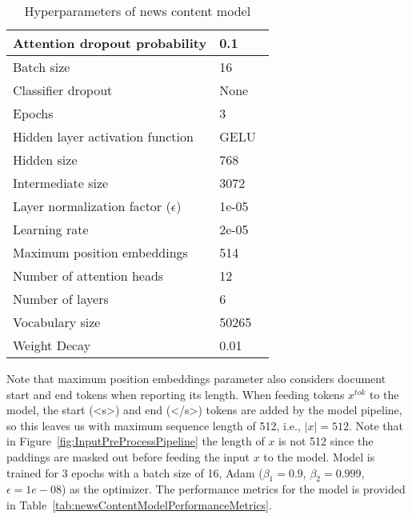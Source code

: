 \begin{table}
    \centering
    \begin{tabular}{|l|l|}
        \hline
        Attention dropout probability           & 0.1                             \\
        \hline
        Batch size                              & 16                              \\
        \hline
        Classifier dropout                      & None                            \\
        \hline
        Epochs                                  & 3                               \\
        \hline
        Hidden layer activation function        & GELU~\parencite{GELU_Hendrycks} \\
        \hline
        Hidden size                             & 768                             \\
        \hline
        Intermediate size                       & 3072                            \\
        \hline
        Layer normalization factor ($\epsilon$) & 1e-05                           \\
        \hline
        Learning rate                           & 2e-05                           \\
        \hline
        Maximum position embeddings             & 514                             \\
        \hline
        Number of attention heads               & 12                              \\
        \hline
        Number of layers                        & 6                               \\
        \hline
        Vocabulary size                         & 50265                           \\
        \hline
        Weight Decay                            & 0.01                            \\
        \hline
    \end{tabular}
    \caption[Parameters of news content model]{Hyperparameters of news content model}
    \label{tab:newsContentModelHyperparameters}
\end{table}
Note that maximum position embeddings parameter also considers document start and end tokens when reporting its length. When feeding tokens $x^{tok}$ to the model, the start (<s>) and end (</s>) tokens are added by the model pipeline, so this leaves us with maximum sequence length of 512, i.e., $|x|=512$. Note that in Figure~\ref{fig:InputPreProcessPipeline} the length of $x$ is not 512 since the paddings are masked out before feeding the input $x$ to the model.   Model is trained for 3 epochs with a batch size of 16, Adam ($\beta_1=0.9$, $\beta_2=0.999$, $\epsilon=1e-08$) as the optimizer. The performance metrics for the model is provided in Table~\ref{tab:newsContentModelPerformanceMetrics}.\\
